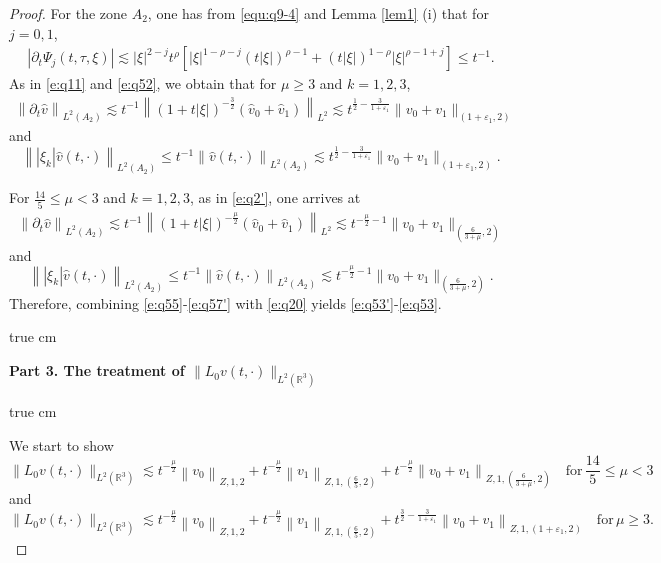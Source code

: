\documentclass[11pt,twoside]{article}
\newcommand{\R}{\mathbb R}
\newcommand{\p}{\partial}
\newcommand{\f}{\frac}
\theoremstyle{plain}
\theoremstyle{definition}
\theoremstyle{remark}
\numberwithin{equation}{section}
\begin{document}
\begin{proof}
For the zone $A_2$,  one has from \eqref{equ:q9-4} and Lemma \ref{lem1} (i) that for $j=0, 1$,
\begin{equation}\label{e:q58'}
\begin{aligned}
|\p_t\Psi_j(t,\tau,\xi)|
\lesssim |\xi|^{2-j} t^{\rho}\left[|\xi|^{1-\rho-j}(t|\xi|)^{\rho-1}+(t|\xi|)^{1-\rho}|\xi|^{\rho-1+j}\right]
\leq t^{-1}.
\end{aligned}
\end{equation}
As in \eqref{e:q11} and \eqref{e:q52}, we obtain that for $\mu\geq3$ and $k=1, 2, 3$,
\begin{equation}\label{e:q58}
\begin{aligned}
\left\|\p_t\hat{v}\right\|_{L^2(A_2)} \lesssim t^{-1}\left\|(1+t|\xi|)^{-\f32}(\hat{v}_{0}+\hat{v}_{1})\right\|_{L^{2}} \lesssim t^{\f12-\f{3}{1+\varepsilon_1}}\|v_0+v_1\|_{(1+\varepsilon_1, 2)}
\end{aligned}
\end{equation}
and
\begin{equation}\label{e:q57}
\left\||\xi_k|\hat{v}(t, \cdot)\right\|_{L^2(A_2)}\leq t^{-1}\left\|\hat{v}(t, \cdot)\right\|_{L^2(A_2)} \lesssim t^{\f12-\f{3}{1+\varepsilon_1}}\|v_0+v_1\|_{(1+\varepsilon_1, 2)}.
\end{equation}

For $\f{14}{5}\leq\mu<3$ and $k=1, 2, 3$, as in \eqref{e:q2'}, one arrives at
\begin{equation}\label{e:q58'}
\begin{aligned}
\left\|\p_t\hat{v}\right\|_{L^2(A_2)} \lesssim t^{-1}\left\|(1+t|\xi|)^{-\f{\mu}{2}}(\hat{v}_{0}+\hat{v}_{1})\right\|_{L^{2}} \lesssim t^{-\f{\mu}{2}-1}\|v_0+v_1\|_{(\f{6}{3+\mu}, 2)}
\end{aligned}
\end{equation}
and
\begin{equation}\label{e:q57'}
\left\||\xi_k|\hat{v}(t, \cdot)\right\|_{L^2(A_2)}\leq t^{-1}\left\|\hat{v}(t, \cdot)\right\|_{L^2(A_2)} \lesssim t^{-\f{\mu}{2}-1}\|v_0+v_1\|_{(\f{6}{3+\mu}, 2)}.
\end{equation}
Therefore, combining  \eqref{e:q55}-\eqref{e:q57'} with \eqref{e:q20} yields \eqref{e:q53'}-\eqref{e:q53}.


 true cm

{\bf Part 3.  The treatment  of $\|L_0v(t, \cdot)\|_{L^2(\R^3)}$ }

 true cm

We start to show
\begin{equation}\label{e:q59'}
\|L_0v(t, \cdot)\|_{L^2(\R^3)} \lesssim t^{-\f{\mu}{2}}\left\|v_0\right\|_{Z, 1, 2}+t^{-\f{\mu}{2}}\left\|v_1\right\|_{Z, 1,(\f65, 2)}+t^{-\f{\mu}{2}}\left\|v_0+v_1\right\|_{Z, 1,(\f{6}{3+\mu}, 2)}\quad \text{for}\, \f{14}{5}\leq\mu<3
\end{equation}
and
\begin{equation}\label{e:q59}
\|L_0v(t, \cdot)\|_{L^2(\R^3)} \lesssim t^{-\f{\mu}{2}}\left\|v_0\right\|_{Z, 1, 2}+t^{-\f{\mu}{2}}\left\|v_1\right\|_{Z, 1,(\f65, 2)}+t^{\f32-\f{3}{1+\varepsilon_1}}\left\|v_0+v_1\right\|_{Z, 1,(1+\varepsilon_1, 2)}\quad \text{for}\, \mu\geq3.
\end{equation}


\end{proof}
\end{document}
